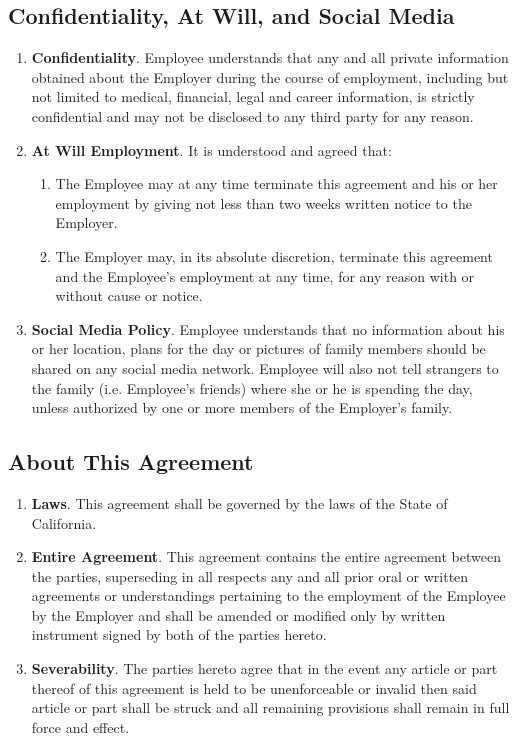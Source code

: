 \documentclass[]{article}
\begin{document}
\subsection*{Confidentiality, At Will, and Social Media}
\begin{enumerate}
	\item{\textbf{Confidentiality}}. Employee understands that any and all private information obtained about the Employer during the course of employment, including but not limited to medical, financial, legal and career information, is strictly confidential and may not be disclosed to any third party for any reason.  
	\item{\textbf{At Will Employment}}. It is understood and agreed that:
		\begin{enumerate}
			\item The Employee may at any time terminate this agreement and his or her employment by giving not less than two weeks written notice to the Employer.
			\item The Employer may, in its absolute discretion, terminate this agreement and the Employee's employment at any time, for any reason with or without cause or notice.
		\end{enumerate}
	\item{\textbf{Social Media Policy}}. Employee understands that no information about his or her location, plans for the day or pictures of family members should be shared on any social media network. Employee will also not tell strangers to the family (i.e.  Employee's friends) where she or he is spending the day, unless authorized by one or more members of the Employer's family.  
\end{enumerate}

\subsection*{About This Agreement}
\begin{enumerate}
	\item{\textbf{Laws}}. This agreement shall be governed by the laws of the State of California.
	\item{\textbf{Entire Agreement}}. This agreement contains the entire agreement between the parties, superseding in all respects any and all prior oral or written agreements or understandings pertaining to the employment of the Employee by the Employer and shall be amended or modified only by written instrument signed by both of the parties hereto.  
	\item{\textbf{Severability}}. The parties hereto agree that in the event any article or part thereof of this agreement is held to be unenforceable or invalid then said article or part shall be struck and all remaining provisions shall remain in full force and effect. 
\end{enumerate}
\end{document}
